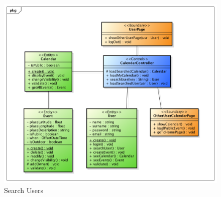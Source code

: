 \begin{center}
 \begin{figure}[H]
    \includegraphics[width=1\textwidth]{../BCEDiagram/BCE/EntityOverview/SearchUserBCE.png}
    \caption{Search Users}
     \label{fig:searchBCE}
     \end{figure}
   \end{center}  


